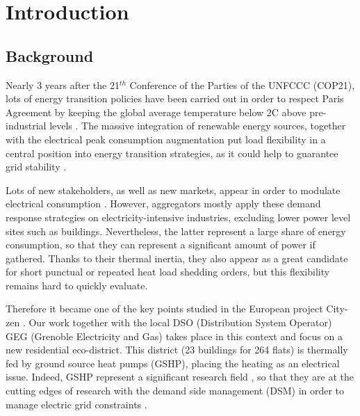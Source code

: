 \documentclass[buildings,article,submit,moreauthors,pdftex,10pt,a4paper]{mdpi}
\theoremstyle{mdpi}
\newcounter{ex}
\newcounter{re}
\theoremstyle{mdpidefinition}
\begin{document}

\section{Introduction}
\subsection{Background}
Nearly 3 years after the 21$^{th}$ Conference of the Parties of the UNFCCC (COP21), lots of energy transition policies have been carried out in order to respect Paris Agreement by keeping the global average temperature  below 2\textdegree{}C above pre-industrial levels \cite{noauthor_paris_nodate}.
The massive integration of renewable energy sources, together with the electrical peak consumption augmentation put load flexibility in a central position into energy transition strategies, as it could help to guarantee grid stability \cite{lund_review_2015}.

Lots of new stakeholders, as well as new markets, appear in order to modulate electrical consumption \cite{ponds_aggregator_2018}. However, aggregators mostly apply these demand response strategies on electricity-intensive industries, excluding lower power level sites such as buildings. %
Nevertheless, the latter represent a large share of energy consumption, so that they can represent a significant amount of power if gathered. Thanks to their thermal inertia, they also appear as a great candidate for short punctual or repeated heat load shedding orders, but this flexibility remains hard to quickly evaluate.

Therefore it became one of the key points studied in the European project City-zen \cite{noauthor_city-zen_nodate}. Our work together with the local DSO (Distribution System Operator) GEG (Grenoble Electricity and Gas) takes place in this context and focus on a new residential eco-district. This district (23 buildings for 264 flats) is thermally fed by ground source heat pumps (GSHP), placing the heating as an electrical issue. Indeed, GSHP represent a significant research field \cite{congedo_cfd_2012, congedo_computational_2014}, so that they are at the cutting edges of research with the demand side management (DSM) in order to manage electric grid constraints \cite{razmara_building--grid_2017}.
\end{document}
